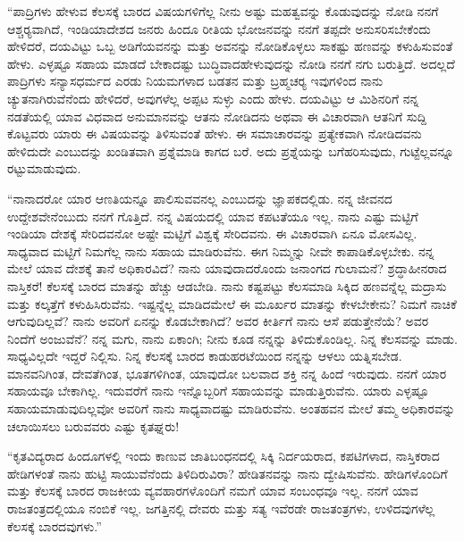  “ಪಾದ್ರಿಗಳು ಹೇಳುವ ಕೆಲಸಕ್ಕೆ ಬಾರದ ವಿಷಯಗಳಿಗೆಲ್ಲ ನೀನು ಅಷ್ಟು ಮಹತ್ವವನ್ನು ಕೊಡುವುದನ್ನು ನೋಡಿ ನನಗೆ ಆಶ್ಚರ‍್ಯವಾಗಿದೆ, ಇಂಡಿಯಾದೇಶದ ಜನರು ಹಿಂದೂ ರೀತಿಯ ಭೋಜನವನ್ನು ನನಗೆ ತಪ್ಪದೇ ಅನುಸರಿಸಬೇಕೆಂದು ಹೇಳಿದರೆ, ದಯವಿಟ್ಟು ಒಬ್ಬ ಅಡಿಗೆಯವನನ್ನು ಮತ್ತು ಅವನನ್ನು ನೋಡಿಕೊಳ್ಳಲು ಸಾಕಷ್ಟು ಹಣವನ್ನು ಕಳುಹಿಸುವಂತೆ ಹೇಳು. ಎಳ್ಳಷ್ಟೂ ಸಹಾಯ ಮಾಡದೆ ಬೇಕಾದಷ್ಟು ಬುದ್ಧಿವಾದಹೇಳುವುದನ್ನು ನೋಡಿ ನನಗೆ ನಗು ಬರುತ್ತಿದೆ. ಅದಲ್ಲದೆ ಪಾದ್ರಿಗಳು ಸನ್ಯಾಸಧರ್ಮದ ಎರಡು ನಿಯಮಗಳಾದ ಬಡತನ ಮತ್ತು ಬ್ರಹ್ಮಚರ‍್ಯ ಇವುಗಳಿಂದ ನಾನು ಚ್ಯುತನಾಗಿರುವೆನೆಂದು ಹೇಳಿದರೆ, ಅವುಗಳೆಲ್ಲ ಅಪ್ಪಟ ಸುಳ್ಳು ಎಂದು ಹೇಳು. ದಯವಿಟ್ಟು ಆ ಮಿಶಿನರಿಗೆ ನನ್ನ ನಡತೆಯಲ್ಲಿ ಯಾವ ವಿಧವಾದ ಅನುಮಾನವನ್ನು ಆತನು ನೋಡಿದನು ಅಥವಾ ಈ ವಿಚಾರವಾಗಿ ಆತನಿಗೆ ಸುದ್ದಿ ಕೊಟ್ಟವರು ಯಾರು ಈ ವಿಷಯವನ್ನು ತಿಳಿಸುವಂತೆ ಹೇಳು. ಈ ಸಮಾಚಾರವನ್ನು ಪ್ರತ್ಯೇಕವಾಗಿ ನೋಡಿದವನು ಹೇಳಿದುದೇ ಎಂಬುದನ್ನು ಖಂಡಿತವಾಗಿ ಪ್ರಶ್ನೆಮಾಡಿ ಕಾಗದ ಬರೆ. ಅದು ಪ್ರಶ್ನೆಯನ್ನು ಬಗೆಹರಿಸುವುದು, ಗುಟ್ಟೆಲ್ಲವನ್ನೂ ರಟ್ಟುಮಾಡುವುದು.

 “ನಾನಾದರೋ‌ ಯಾರ ಆಣತಿಯನ್ನೂ ಪಾಲಿಸುವವನಲ್ಲ ಎಂಬುದನ್ನು ಜ್ಞಾಪಕದಲ್ಲಿಡು. ನನ್ನ ಜೀವನದ ಉದ್ದೇಶವೇನೆಂಬುದು ನನಗೆ ಗೊತ್ತಿದೆ. ನನ್ನ ವಿಷಯದಲ್ಲಿ ಯಾವ ಕಪಟತೆಯೂ ಇಲ್ಲ. ನಾನು ಎಷ್ಟು ಮಟ್ಟಿಗೆ ಇಂಡಿಯಾ ದೇಶಕ್ಕೆ ಸೇರಿದವನೋ ಅಷ್ಟೇ ಮಟ್ಟಿಗೆ ವಿಶ್ವಕ್ಕೆ ಸೇರಿದವನು. ಈ ವಿಚಾರವಾಗಿ ಏನೂ ಮೋಸವಿಲ್ಲ. ಸಾಧ್ಯವಾದ ಮಟ್ಟಿಗೆ ನಿಮಗೆಲ್ಲ ನಾನು ಸಹಾಯ ಮಾಡಿರುವೆನು. ಈಗ ನಿಮ್ಮನ್ನು ನೀವೇ ಕಾಪಾಡಿಕೊಳ್ಳಬೇಕು. ನನ್ನ ಮೇಲೆ ಯಾವ ದೇಶಕ್ಕೆ ತಾನೆ ಅಧಿಕಾರವಿದೆ? ನಾನು ಯಾವುದಾದರೊಂದು ಜನಾಂಗದ ಗುಲಾಮನೆ? ಶ್ರದ್ಧಾಹೀನರಾದ ನಾಸ್ತಿಕರೆ! ಕೆಲಸಕ್ಕೆ ಬಾರದ ಮಾತನ್ನು ಹೆಚ್ಚು ಆಡಬೇಡಿ. ನಾನು ಕಷ್ಟಪಟ್ಟು ಕೆಲಸಮಾಡಿ ಸಿಕ್ಕಿದ ಹಣವನ್ನೆಲ್ಲ ಮದ್ರಾಸು ಮತ್ತು ಕಲ್ಕತ್ತೆಗೆ ಕಳುಹಿಸಿರುವೆನು. ಇಷ್ಟನ್ನೆಲ್ಲ ಮಾಡಿದಮೇಲೆ ಈ ಮೂರ್ಖರ ಮಾತನ್ನು ಕೇಳಬೇಕೇನು? ನಿಮಗೆ ನಾಚಿಕೆ ಆಗುವುದಿಲ್ಲವೆ? ನಾನು ಅವರಿಗೆ ಏನನ್ನು ಕೊಡಬೇಕಾಗಿದೆ? ಅವರ ಕೀರ್ತಿಗೆ ನಾನು ಆಸೆ ಪಡುತ್ತೇನೆಯೆ? ಅವರ ನಿಂದೆಗೆ ಅಂಜುವೆನೆ? ನನ್ನ ಮಗು, ನಾನು ಏಕಾಂಗಿ; ನೀನು ಕೂಡ ನನ್ನನ್ನು ತಿಳಿದುಕೊಂಡಿಲ್ಲ. ನಿನ್ನ ಕೆಲಸವನ್ನು ಮಾಡು. ಸಾಧ್ಯವಿಲ್ಲದೇ ಇದ್ದರೆ ನಿಲ್ಲಿಸು. ನಿನ್ನ ಕೆಲಸಕ್ಕೆ ಬಾರದ ಕಾಡುಹರಟೆಯಿಂದ ನನ್ನನ್ನು ಆಳಲು ಯತ್ನಿಸಬೇಡ. ಮಾನವನಿಗಿಂತ, ದೇವತೆಗಿಂತ, ಭೂತಗಳಿಗಿಂತ, ಯಾವುದೋ ಬಲವಾದ ಶಕ್ತಿ ನನ್ನ ಹಿಂದೆ ಇರುವುದು. ನನಗೆ ಯಾರ ಸಹಾಯವೂ ಬೇಕಾಗಿಲ್ಲ. ಇದುವರೆಗೆ ನಾನು ಇನ್ನೊಬ್ಬರಿಗೆ ಸಹಾಯವನ್ನು ಮಾಡುತ್ತಿರುವೆನು. ಯಾರು ಎಳ್ಳಷ್ಟೂ ಸಹಾಯ\break ಮಾಡುವುದಿಲ್ಲವೋ ಅವರಿಗೆ ನಾನು ಸಾಧ್ಯವಾದಷ್ಟು ಮಾಡಿರುವೆನು. ಅಂತಹವನ ಮೇಲೆ ತಮ್ಮ ಅಧಿಕಾರವನ್ನು ಚಲಾಯಿಸಲು ಬರುವವರು ಎಷ್ಟು ಕೃತಘ್ನರು!

 “ಕೃತವಿದ್ಯರಾದ ಹಿಂದೂಗಳಲ್ಲಿ ಇಂದು ಕಾಣುವ ಜಾತಿಬಂಧನದಲ್ಲಿ ಸಿಕ್ಕಿ ನಿರ್ದಯರಾದ, ಕಪಟಿಗಳಾದ, ನಾಸ್ತಿಕರಾದ ಹೇಡಿಗಳಂತೆ ನಾನು ಹುಟ್ಟಿ ಸಾಯುವೆನೆಂದು ತಿಳಿದಿರುವಿರಾ? ಹೇಡಿತನವನ್ನು ನಾನು ದ್ವೇಷಿಸುವೆನು. ಹೇಡಿಗಳೊಂದಿಗೆ ಮತ್ತು ಕೆಲಸಕ್ಕೆ ಬಾರದ ರಾಜಕೀಯ ವ್ಯವಹಾರಗಳೊಂದಿಗೆ ನಮಗೆ ಯಾವ ಸಂಬಂಧವೂ ಇಲ್ಲ. ನನಗೆ ಯಾವ ರಾಜತಂತ್ರದಲ್ಲಿಯೂ ನಂಬಿಕೆ ಇಲ್ಲ. ಜಗತ್ತಿನಲ್ಲಿ ದೇವರು ಮತ್ತು ಸತ್ಯ ಇವೆರಡೇ ರಾಜತಂತ್ರಗಳು, ಉಳಿದವುಗಳೆಲ್ಲ ಕೆಲಸಕ್ಕೆ ಬಾರದವುಗಳು.” 

